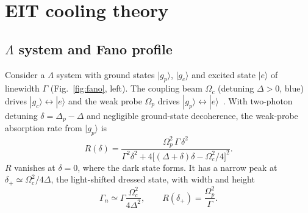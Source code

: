 \documentclass[11pt,a4paper]{article}
\newcommand{\ket}[1]{|#1\rangle}
\newcommand{\gp}{\ket{g_p}}
\newcommand{\gc}{\ket{g_c}}
\newcommand{\Om}{\Omega}
\begin{document}
\section{EIT cooling theory}
\label{sec:eit}
\subsection{$\Lambda$ system and Fano profile}
Consider a $\Lambda$ system with ground states $\gp$, $\gc$ and excited state $\ket e$ of linewidth $\Gamma$ (Fig.~\ref{fig:fano}, left). The coupling beam $\Om_c$ (detuning $\Delta>0$, blue) drives $\gc\leftrightarrow\ket e$ and the weak probe $\Om_p$ drives $\gp\leftrightarrow\ket e$~\cite{fleischhauer2005,morigi2000}. With two-photon detuning $\delta=\Delta_p-\Delta$ and negligible ground-state decoherence, the weak-probe absorption rate from $\gp$ is
\begin{equation}
  R(\delta)=\frac{\Om_p^2\,\Gamma\,\delta^2}{\Gamma^2\delta^2+4\big[(\Delta+\delta)\delta-\Om_c^2/4\big]^2}.
  \label{eq:fano}
\end{equation}
$R$ vanishes at $\delta=0$, where the dark state forms. It has a narrow peak at $\delta_+\simeq\Om_c^2/4\Delta$, the light-shifted dressed state, with width and height
\begin{equation}
  \Gamma_n\simeq\Gamma\frac{\Om_c^2}{4\Delta^2},\qquad R(\delta_+)=\frac{\Om_p^2}{\Gamma}.
  \label{eq:narrow}
\end{equation}
\end{document}
